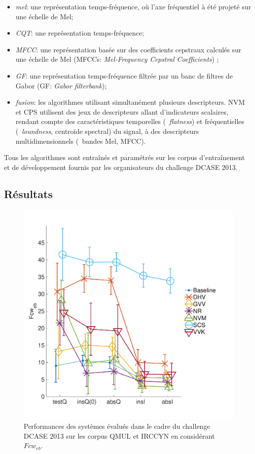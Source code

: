 \begin{itemize}
\item \emph{mel}: une représentation temps-fréquence, où l'axe fréquentiel à été projeté sur une échelle de Mel;
\item \emph{CQT}: une représentation temps-fréquence; 
\item \emph{MFCC}: une représentation basée sur des coefficients cepstraux calculés sur une échelle de Mel (MFCCs: \emph{Mel-Frequency Cepstral Coefficients}) \citep{Davis80a};
\item \emph{GF}: une représentation temps-fréquence filtrée par un banc de filtres de Gabor (GF: \emph{Gabor filterbank});
\item \emph{fusion}: les algorithmes utilisant simultanément plusieurs descripteurs. NVM et CPS utilisent des jeux de descripteurs allant d'indicateurs scalaires, rendant compte des caractéristiques temporelles (\eg~\emph{flatness}) et fréquentielles (\eg~\emph{loundness}, centroïde spectral) du signal, à des descripteurs multidimensionnels (\eg~bandes Mel, MFCC).
\end{itemize}


Tous les algorithmes sont entraînés et paramétrés sur les corpus d'entraînement et de développement fournis par les organisateurs du challenge DCASE 2013. \\

\subsection{Résultats}

\begin{figure}[t]
\includegraphics[width=1\columnwidth]{gfx/ch_7/dcase2013_1}
\caption{Performances des systèmes évalués dans le cadre du challenge DCASE 2013 sur les corpus QMUL et IRCCYN en considérant $Fcw_{eb}$.}
\label{fig:irccyn}
\end{figure}

